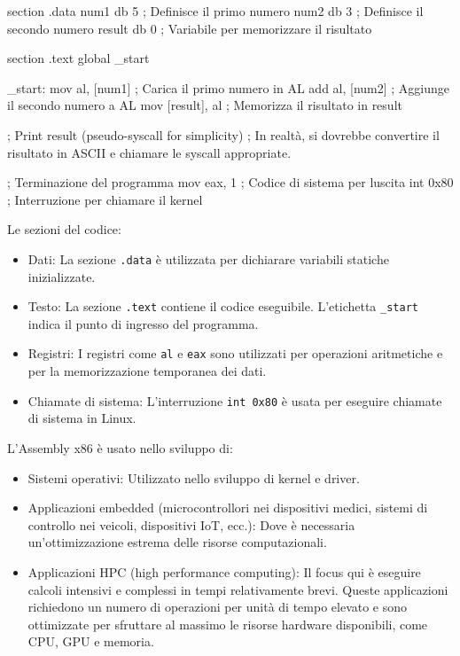 \documentclass[
  letterpaper,
  DIV=11,
  numbers=noendperiod]{scrreprt}
\newenvironment{Shaded}{\begin{snugshade}}{\end{snugshade}}
\newcommand{\NormalTok}[1]{\textcolor[rgb]{0.00,0.23,0.31}{#1}}
\providecommand{\tightlist}{%
  \setlength{\itemsep}{0pt}\setlength{\parskip}{0pt}}\usepackage{longtable,booktabs,array}
\begin{document}
\begin{Shaded}
\begin{Highlighting}[]
\NormalTok{section .data}
\NormalTok{    num1 db 5           ; Definisce il primo numero}
\NormalTok{    num2 db 3           ; Definisce il secondo numero}
\NormalTok{    result db 0         ; Variabile per memorizzare il risultato}

\NormalTok{section .text}
\NormalTok{    global \_start}

\NormalTok{\_start:}
\NormalTok{    mov al, [num1]      ; Carica il primo numero in AL}
\NormalTok{    add al, [num2]      ; Aggiunge il secondo numero a AL}
\NormalTok{    mov [result], al    ; Memorizza il risultato in result}

\NormalTok{    ; Print result (pseudo{-}syscall for simplicity)}
\NormalTok{    ; In realtà, si dovrebbe convertire il risultato in ASCII e chiamare le syscall appropriate.}
    
\NormalTok{    ; Terminazione del programma}
\NormalTok{    mov eax, 1          ; Codice di sistema per l\textquotesingle{}uscita}
\NormalTok{    int 0x80            ; Interruzione per chiamare il kernel}
\end{Highlighting}
\end{Shaded}

Le sezioni del codice:

\begin{itemize}
\tightlist
\item
  Dati: La sezione \texttt{.data} è utilizzata per dichiarare variabili
  statiche inizializzate.
\item
  Testo: La sezione \texttt{.text} contiene il codice eseguibile.
  L'etichetta \texttt{\_start} indica il punto di ingresso del
  programma.
\item
  Registri: I registri come \texttt{al} e \texttt{eax} sono utilizzati
  per operazioni aritmetiche e per la memorizzazione temporanea dei
  dati.
\item
  Chiamate di sistema: L'interruzione \texttt{int\ 0x80} è usata per
  eseguire chiamate di sistema in Linux.
\end{itemize}

L'Assembly x86 è usato nello sviluppo di:

\begin{itemize}
\tightlist
\item
  Sistemi operativi: Utilizzato nello sviluppo di kernel e driver.
\item
  Applicazioni embedded (microcontrollori nei dispositivi medici,
  sistemi di controllo nei veicoli, dispositivi IoT, ecc.): Dove è
  necessaria un'ottimizzazione estrema delle risorse computazionali.
\item
  Applicazioni HPC (high performance computing): Il focus qui è eseguire
  calcoli intensivi e complessi in tempi relativamente brevi. Queste
  applicazioni richiedono un numero di operazioni per unità di tempo
  elevato e sono ottimizzate per sfruttare al massimo le risorse
  hardware disponibili, come CPU, GPU e memoria.
\end{itemize}
\end{document}
